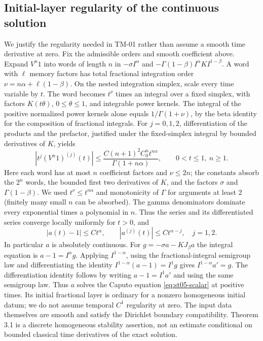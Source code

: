 \documentclass[11pt,a4paper]{amsart}
\theoremstyle{remark}
\theoremstyle{plain}
\theoremstyle{remark}
\numberwithin{equation}{section}
\begin{document}
\subsection{Initial-layer regularity of the continuous solution}
We justify the regularity needed in TM-01 rather than assume a smooth time derivative at zero. Fix the admissible orders and smooth coefficient above. Expand $V^n1$ into words of length $n$ in $-\sigma I^\alpha$ and $-\Gamma(1-\beta) I^\alpha K I^{1-\beta}$. A word with $\ell$ memory factors has total fractional integration order $\nu=n\alpha+\ell(1-\beta)$. On the nested integration simplex, scale every time variable by $t$. The word becomes $t^\nu$ times an integral over a fixed simplex, with factors $K(t\theta)$, $0\le\theta\le1$, and integrable power kernels. The integral of the positive normalized power kernels alone equals $1/\Gamma(1+\nu)$, by the beta identity for the composition of fractional integrals. For $j=0,1,2$, differentiation of the products and the prefactor, justified under the fixed-simplex integral by bounded derivatives of $K$, yields
\[
 \left|t^j (V^n1)^{(j)}(t)\right|
 \le \frac{C(n+1)^2 C_0^n t^{n\alpha}}{\Gamma(1+n\alpha)},\qquad 0<t\le1,\ n\ge1.
\]
Here each word has at most $n$ coefficient factors and $\nu\le2n$; the constants absorb the $2^n$ words, the bounded first two derivatives of $K$, and the factors $\sigma$ and $\Gamma(1-\beta)$. We used $t^\nu\le t^{n\alpha}$ and monotonicity of $\Gamma$ for arguments at least 2 (finitely many small $n$ can be absorbed). The gamma denominators dominate every exponential times a polynomial in $n$. Thus the series and its differentiated series converge locally uniformly for $t>0$, and
\begin{equation}\label{eq:st05-reg}
 |a(t)-1|\le Ct^\alpha,\qquad |a^{(j)}(t)|\le Ct^{\alpha-j},\quad j=1,2.
\end{equation}
In particular $a$ is absolutely continuous. For $g=-\sigma a-KJ_\beta a$ the integral equation is $a-1=I^\alpha g$. Applying $I^{1-\alpha}$, using the fractional-integral semigroup law and differentiating the identity $I^{1-\alpha}(a-1)=I^1g$ gives $I^{1-\alpha}a'=g$. The differentiation identity follows by writing $a-1=I^1a'$ and using the same semigroup law. Thus $a$ solves the Caputo equation \eqref{eq:st05-scalar} at positive times. Its initial fractional layer is ordinary for a nonzero homogeneous initial datum; we do not assume temporal $C^1$ regularity at zero. The input data themselves are smooth and satisfy the Dirichlet boundary compatibility. Theorem 3.1 is a discrete homogeneous stability assertion, not an estimate conditional on bounded classical time derivatives of the exact solution.
\end{document}
